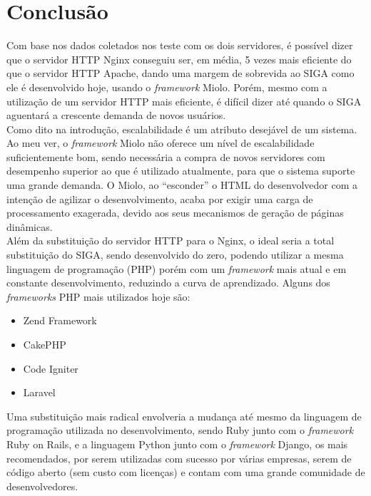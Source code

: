 \chapter{Conclusão}\label{cap:conclusao}
Com base nos dados coletados nos teste com os dois servidores, é possível dizer 
que o servidor HTTP Nginx conseguiu ser, em média, 5 vezes mais eficiente do 
que o servidor HTTP Apache, dando uma margem de sobrevida ao SIGA como ele é 
desenvolvido hoje, usando o \textit{framework} Miolo. Porém, mesmo com a 
utilização de um servidor HTTP mais eficiente, é difícil dizer até quando o  
SIGA aguentará a crescente demanda de novos usuários.\\
Como dito na introdução, escalabilidade é um atributo desejável de um sistema. 
Ao meu ver, o \textit{framework} Miolo não oferece um nível de escalabilidade 
suficientemente bom, sendo necessária a compra de novos servidores com 
desempenho superior ao que é utilizado atualmente, para que o sistema suporte 
uma grande demanda. O Miolo, ao ``esconder'' o HTML do desenvolvedor com a 
intenção de agilizar o desenvolvimento, acaba por exigir uma carga de 
processamento exagerada, devido aos seus mecanismos de geração de páginas 
dinâmicas.\\
Além da substituição do servidor HTTP para o Nginx, o ideal seria a total 
substituição do SIGA, sendo desenvolvido do zero, podendo utilizar a mesma 
linguagem de programação (PHP) porém com um \textit{framework} mais atual e em 
constante desenvolvimento, reduzindo a curva de aprendizado. Alguns dos  
\textit{frameworks} PHP mais utilizados hoje são:
\begin{itemize}
	\item Zend Framework
	\item CakePHP
	\item Code Igniter
	\item Laravel
\end{itemize}
Uma substituição mais radical envolveria a mudança até mesmo da linguagem de 
programação utilizada no desenvolvimento, sendo Ruby junto com o 
\textit{framework} Ruby on Rails, e a linguagem Python junto com o 
\textit{framework} Django, os mais recomendados, por serem utilizadas com 
sucesso por várias empresas, serem de código aberto (sem custo com licenças) e 
contam com uma grande comunidade de desenvolvedores.
